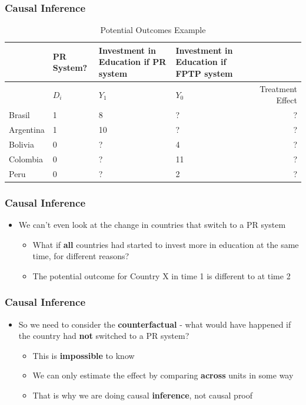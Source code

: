 \documentclass[xcolor=x11names,compress]{beamer}\usepackage[]{graphicx}\usepackage[]{color}
\renewcommand{\(}{\begin{columns}}
\renewcommand{\)}{\end{columns}}
\newcommand{\<}[1]{\begin{column}{#1}}
\renewcommand{\>}{\end{column}}
\begin{document}
\begin{frame}
\frametitle{Causal Inference}
\footnotesize
\begin{table}[htbp]
  \centering
  \caption{Potential Outcomes Example}
    \begin{tabular}{|p{1.8cm}|p{2.2cm}|p{2.2cm}|p{1.8cm}|r|}
    \hline
          & \multicolumn{1}{p{1.8cm}|}{PR System?} & \multicolumn{1}{p{2.2cm}|}{Investment in Education if PR system} & \multicolumn{1}{p{2.2cm}|}{Investment in Education if FPTP system} &  \bigstrut\\
    \hline
          & \multicolumn{1}{p{1.8cm}|}{$D_i$} & \multicolumn{1}{p{2.2cm}|}{$Y_1$} & \multicolumn{1}{p{2.2cm}|}{$Y_0$} & \multicolumn{1}{p{1.8cm}|}{Treatment Effect} \bigstrut\\
    \hline
    Brasil & 1 & 8     & ?      & ? \bigstrut\\
    \hline
    Argentina & 1 & 10    & ?      & ? \bigstrut\\
    \hline
    Bolivia & 0 & ?     & 4     & ? \bigstrut\\
    \hline
    Colombia & 0 &  ?   & 11    & ? \bigstrut\\
    \hline
    Peru & 0 & ?     & 2     & ? \bigstrut\\
    \hline
    \end{tabular}%
  \label{tab:addlabel}%
\end{table}%
\normalsize
\end{frame}

\begin{frame}
\frametitle{Causal Inference}
\begin{itemize}
\item We can't even look at the change in countries that switch to a PR system
\begin{itemize}
\item What if \textbf{all} countries had started to invest more in education at the same time, for different reasons?
\item The potential outcome for Country X in time 1 is different to at time 2
\end{itemize}
\end{itemize}
\end{frame}

\begin{frame}
\frametitle{Causal Inference}
\begin{itemize}
\item So we need to consider the \textbf{counterfactual} - what would have happened if the country had \textbf{not} switched to a PR system?
\begin{itemize}
\item This is \textbf{impossible} to know
\item We can only estimate the effect by comparing \textbf{across} units in some way
\item That is why we are doing causal \textbf{inference}, not causal proof
\end{itemize}
\end{itemize}
\end{frame}
\end{document}
